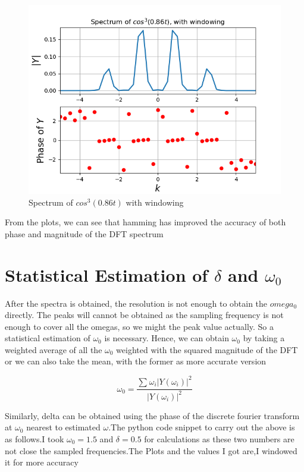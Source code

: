 \documentclass[12pt, a4paper]{report}
\begin{document}
 
 
 
  \begin{figure}[!tbh]
   	\centering
   	\includegraphics[scale=0.7]{Q2b.png}
	\caption{Spectrum of $cos^3(0.86t)$ with windowing}
 \end{figure} 

From the plots, we can see that hamming has improved the accuracy of both phase and magnitude of the DFT spectrum

 \section*{Statistical Estimation of $\delta$ and $\omega_0$ } 
 
 After the spectra is obtained, the resolution is not enough to obtain the $omega_0$ directly. The peaks will cannot be obtained as the sampling frequency is not enough to cover all the omegas, so we might the peak value actually. So a statistical estimation of $\omega_0$ is necessary. Hence, we can obtain $\omega_0$ by taking a weighted average of all the $\omega_0$ weighted with the squared magnitude of the DFT or we can also take the mean, with the former as more accurate version
 
 \begin{equation*}
 \omega_0 = \frac{\sum_{} ^{} \omega_i |Y(\omega_i)|^2}{ |Y(\omega_i)|^2}   
  \end{equation*}
 
  Similarly, delta can be obtained using the phase of the discrete fourier transform at $\omega_0$ nearest to estimated $\omega$.The python code snippet to carry out the above is as follows.I took $\omega_0= 1.5$ and $\delta = 0.5$ for calculations as these two numbers are not close the sampled frequencies.The Plots and the values I got are,I windowed it for more accuracy
  
\end{document}
